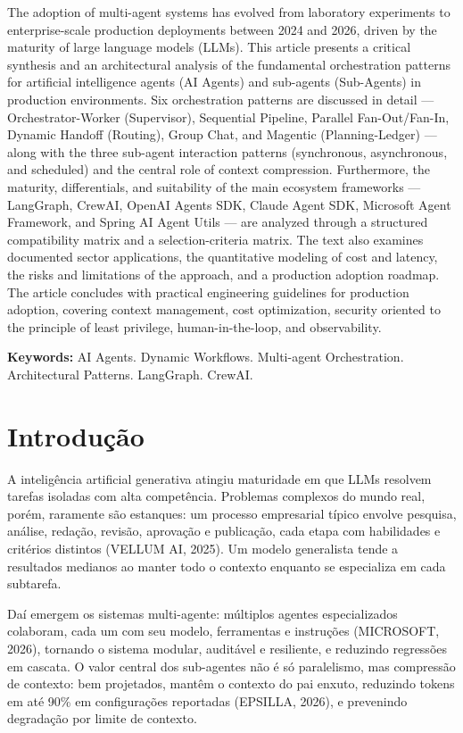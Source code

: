 \documentclass[12pt,a4paper]{article}
\begin{document}
The adoption of multi-agent systems has evolved from laboratory experiments to enterprise-scale production deployments between 2024 and 2026, driven by the maturity of large language models (LLMs). This article presents a critical synthesis and an architectural analysis of the fundamental orchestration patterns for artificial intelligence agents (AI Agents) and sub-agents (Sub-Agents) in production environments. Six orchestration patterns are discussed in detail — Orchestrator-Worker (Supervisor), Sequential Pipeline, Parallel Fan-Out/Fan-In, Dynamic Handoff (Routing), Group Chat, and Magentic (Planning-Ledger) — along with the three sub-agent interaction patterns (synchronous, asynchronous, and scheduled) and the central role of context compression. Furthermore, the maturity, differentials, and suitability of the main ecosystem frameworks — LangGraph, CrewAI, OpenAI Agents SDK, Claude Agent SDK, Microsoft Agent Framework, and Spring AI Agent Utils — are analyzed through a structured compatibility matrix and a selection-criteria matrix. The text also examines documented sector applications, the quantitative modeling of cost and latency, the risks and limitations of the approach, and a production adoption roadmap. The article concludes with practical engineering guidelines for production adoption, covering context management, cost optimization, security oriented to the principle of least privilege, human-in-the-loop, and observability.

\textbf{Keywords:} AI Agents. Dynamic Workflows. Multi-agent Orchestration. Architectural Patterns. LangGraph. CrewAI.


\section{Introdução}

A inteligência artificial generativa atingiu maturidade em que LLMs resolvem tarefas isoladas com alta competência. Problemas complexos do mundo real, porém, raramente são estanques: um processo empresarial típico envolve pesquisa, análise, redação, revisão, aprovação e publicação, cada etapa com habilidades e critérios distintos (VELLUM AI, 2025). Um modelo generalista tende a resultados medianos ao manter todo o contexto enquanto se especializa em cada subtarefa.

Daí emergem os sistemas multi-agente: múltiplos agentes especializados colaboram, cada um com seu modelo, ferramentas e instruções (MICROSOFT, 2026), tornando o sistema modular, auditável e resiliente, e reduzindo regressões em cascata. O valor central dos sub-agentes não é só paralelismo, mas compressão de contexto: bem projetados, mantêm o contexto do pai enxuto, reduzindo tokens em até 90\% em configurações reportadas (EPSILLA, 2026), e prevenindo degradação por limite de contexto.
\end{document}
